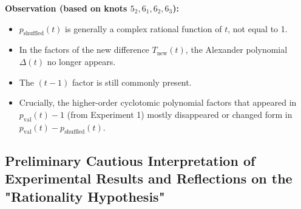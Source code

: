 \documentclass{article}[a4paper,12pt]
\begin{document}
\textbf{Observation (based on knots $5_2, 6_1, 6_2, 6_3$):}
\begin{itemize}
    \item $p_{\text{shuffled}}(t)$ is generally a complex rational function of $t$, not equal to 1.
    \item In the factors of the new difference $T_{\text{new}}(t)$, the Alexander polynomial $\Delta(t)$ no longer appears.
    \item The $(t-1)$ factor is still commonly present.
    \item Crucially, the higher-order cyclotomic polynomial factors that appeared in $p_{\text{val}}(t)-1$ (from Experiment 1) mostly disappeared or changed form in $p_{\text{val}}(t)-p_{\text{shuffled}}(t)$.
\end{itemize}

\subsection*{Preliminary Cautious Interpretation of Experimental Results and Reflections on the "Rationality Hypothesis"}
\end{document}
